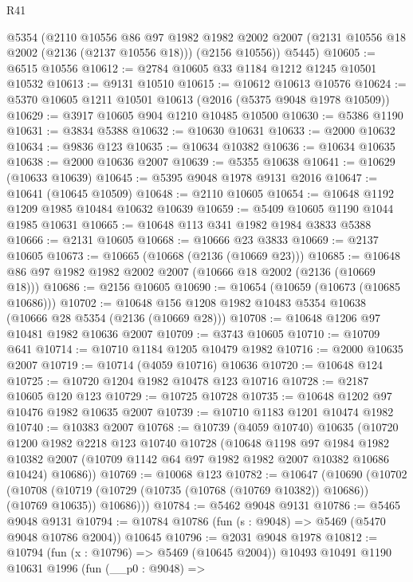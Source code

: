 \begin{lexlean}{R41}
\begin{coremodule}
      @5354
      (@2110
        @10556
        @86
        @97
        @1982
        @1982
        @2002
        @2007
        (@2131 @10556 @18 @2002 (@2136 (@2137 @10556 @18)))
        (@2156 @10556))
      @5445)
@10605 := @6515 @10556
@10612 := @2784 @10605 @33 @1184 @1212 @1245 @10501 @10532
@10613 := @9131 @10510
@10615 := @10612 @10613 @10576
@10624 := @5370 @10605 @1211 @10501 @10613 (@2016 (@5375 @9048 @1978 @10509))
@10629 := @3917 @10605 @904 @1210 @10485 @10500
@10630 := @5386 @1190
@10631 := @3834 @5388
@10632 := @10630 @10631
@10633 := @2000 @10632
@10634 := @9836 @123
@10635 := @10634 @10382
@10636 := @10634 @10635
@10638 := @2000 @10636 @2007
@10639 := @5355 @10638
@10641 := @10629 (@10633 @10639)
@10645 := @5395 @9048 @1978 @9131 @2016
@10647 := @10641 (@10645 @10509)
@10648 := @2110 @10605
@10654 := @10648 @1192 @1209 @1985 @10484 @10632 @10639
@10659 := @5409 @10605 @1190 @1044 @1985 @10631
@10665 := @10648 @113 @341 @1982 @1984 @3833 @5388
@10666 := @2131 @10605
@10668 := @10666 @23 @3833
@10669 := @2137 @10605
@10673 := @10665 (@10668 (@2136 (@10669 @23)))
@10685 := @10648 @86 @97 @1982 @1982 @2002 @2007 (@10666 @18 @2002 (@2136 (@10669 @18)))
@10686 := @2156 @10605
@10690 := @10654 (@10659 (@10673 (@10685 @10686)))
@10702 := @10648 @156 @1208 @1982 @10483 @5354 @10638 (@10666 @28 @5354 (@2136 (@10669 @28)))
@10708 := @10648 @1206 @97 @10481 @1982 @10636 @2007
@10709 := @3743 @10605
@10710 := @10709 @641
@10714 := @10710 @1184 @1205 @10479 @1982
@10716 := @2000 @10635 @2007
@10719 := @10714 (@4059 @10716) @10636
@10720 := @10648 @124
@10725 := @10720 @1204 @1982 @10478 @123 @10716
@10728 := @2187 @10605 @120 @123
@10729 := @10725 @10728
@10735 := @10648 @1202 @97 @10476 @1982 @10635 @2007
@10739 := @10710 @1183 @1201 @10474 @1982
@10740 := @10383 @2007
@10768 := @10739
    (@4059 @10740)
    @10635
    (@10720
      @1200
      @1982
      @2218
      @123
      @10740
      @10728
      (@10648
        @1198
        @97
        @1984
        @1982
        @10382
        @2007
        (@10709 @1142 @64 @97 @1982 @1982 @2007 @10382 @10686 @10424)
        @10686))
@10769 := @10068 @123
@10782 := @10647
    (@10690
      (@10702
        (@10708 (@10719 (@10729 (@10735 (@10768 (@10769 @10382)) @10686)) (@10769 @10635)) @10686)))
@10784 := @5462 @9048 @9131
@10786 := @5465 @9048 @9131
@10794 := @10784 @10786 (fun (s : @9048) => @5469 (@5470 @9048 @10786 @2004)) @10645
@10796 := @2031 @9048 @1978
@10812 := @10794
    (fun (x : @10796) => @5469 (@10645 @2004))
    @10493
    @10491
    @1190
    @10631
    @1996
    (fun (__p0 : @9048) =>

\end{coremodule}
\end{lexlean}
